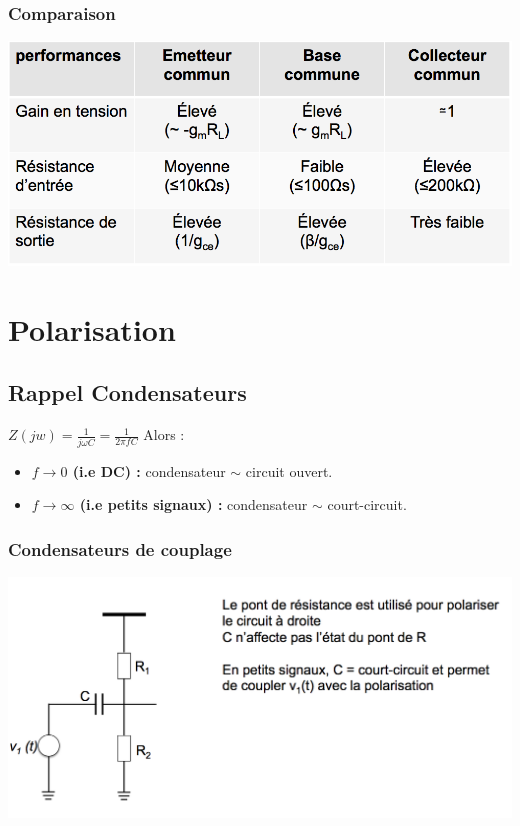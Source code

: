 \documentclass[]{article}
\begin{document}
\subsubsection{Comparaison}
\includegraphics[scale=0.5]{comp}

\section{Polarisation}
\subsection{Rappel Condensateurs}
$ Z(jw) = \frac{1}{j\omega C} = \frac{1}{2\pi f C} $
Alors :
\begin{itemize}
\item \textbf{$f\rightarrow 0$  (i.e DC) :} condensateur $\sim$ circuit ouvert.
\item \textbf{$f\rightarrow \infty$ (i.e petits signaux) :} condensateur $\sim$ court-circuit.
\end{itemize}

\subsubsection{Condensateurs de couplage}
\includegraphics[scale=0.5]{couplage}
\end{document}

